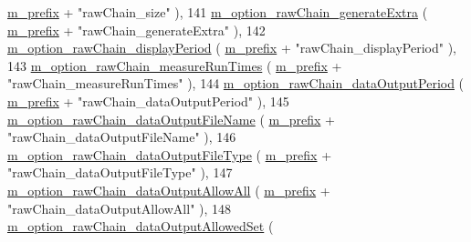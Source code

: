 \begin{DoxyCode}
      \hyperlink{class_q_u_e_s_o_1_1_m_l_sampling_level_options_a4423067de3fa689d820abeba4dc5babc}{m\_prefix} + \textcolor{stringliteral}{"rawChain\_size"}                             ),
141   \hyperlink{class_q_u_e_s_o_1_1_m_l_sampling_level_options_a775bb8dfb4e5f2a0069667586eb1b336}{m\_option\_rawChain\_generateExtra}                    (
      \hyperlink{class_q_u_e_s_o_1_1_m_l_sampling_level_options_a4423067de3fa689d820abeba4dc5babc}{m\_prefix} + \textcolor{stringliteral}{"rawChain\_generateExtra"}                    ),
142   \hyperlink{class_q_u_e_s_o_1_1_m_l_sampling_level_options_ad71a6b65d66c81154cabef647419cff0}{m\_option\_rawChain\_displayPeriod}                    (
      \hyperlink{class_q_u_e_s_o_1_1_m_l_sampling_level_options_a4423067de3fa689d820abeba4dc5babc}{m\_prefix} + \textcolor{stringliteral}{"rawChain\_displayPeriod"}                    ),
143   \hyperlink{class_q_u_e_s_o_1_1_m_l_sampling_level_options_a0dab337e638625987315c34660d8846e}{m\_option\_rawChain\_measureRunTimes}                  (
      \hyperlink{class_q_u_e_s_o_1_1_m_l_sampling_level_options_a4423067de3fa689d820abeba4dc5babc}{m\_prefix} + \textcolor{stringliteral}{"rawChain\_measureRunTimes"}                  ),
144   \hyperlink{class_q_u_e_s_o_1_1_m_l_sampling_level_options_a6fd76d8d884e3432274110a02f98086b}{m\_option\_rawChain\_dataOutputPeriod}                 (
      \hyperlink{class_q_u_e_s_o_1_1_m_l_sampling_level_options_a4423067de3fa689d820abeba4dc5babc}{m\_prefix} + \textcolor{stringliteral}{"rawChain\_dataOutputPeriod"}                 ),
145   \hyperlink{class_q_u_e_s_o_1_1_m_l_sampling_level_options_ad1d736cccbf3be64e1998c18ead26630}{m\_option\_rawChain\_dataOutputFileName}               (
      \hyperlink{class_q_u_e_s_o_1_1_m_l_sampling_level_options_a4423067de3fa689d820abeba4dc5babc}{m\_prefix} + \textcolor{stringliteral}{"rawChain\_dataOutputFileName"}               ),
146   \hyperlink{class_q_u_e_s_o_1_1_m_l_sampling_level_options_a3cbc234ca24903ff9addc9a379bb69bf}{m\_option\_rawChain\_dataOutputFileType}               (
      \hyperlink{class_q_u_e_s_o_1_1_m_l_sampling_level_options_a4423067de3fa689d820abeba4dc5babc}{m\_prefix} + \textcolor{stringliteral}{"rawChain\_dataOutputFileType"}               ),
147   \hyperlink{class_q_u_e_s_o_1_1_m_l_sampling_level_options_a5edf0fb3329b34a79dee8d3f2187dd28}{m\_option\_rawChain\_dataOutputAllowAll}               (
      \hyperlink{class_q_u_e_s_o_1_1_m_l_sampling_level_options_a4423067de3fa689d820abeba4dc5babc}{m\_prefix} + \textcolor{stringliteral}{"rawChain\_dataOutputAllowAll"}               ),
148   \hyperlink{class_q_u_e_s_o_1_1_m_l_sampling_level_options_ad7b34b44ea9dcfbf9092167bdb9d4ecb}{m\_option\_rawChain\_dataOutputAllowedSet}             (

\end{DoxyCode}
